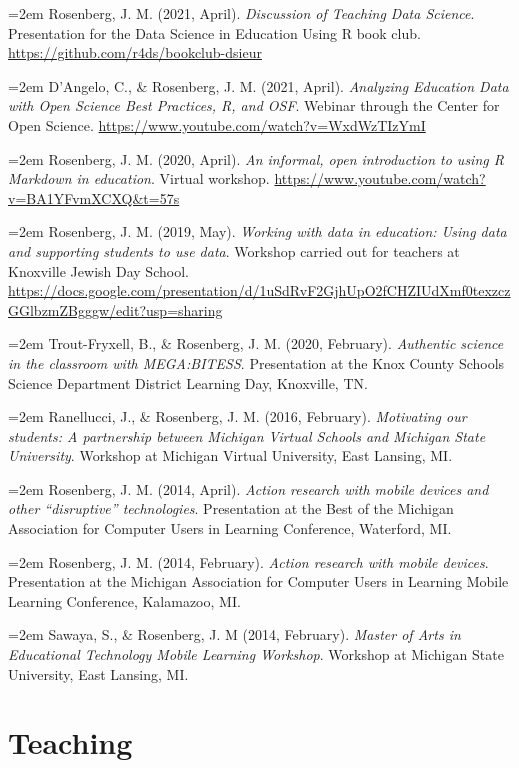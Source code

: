 \documentclass[
  14,
]{article}
\begin{document}
\hangindent=2em Rosenberg, J. M. (2021, April). \emph{Discussion of
Teaching Data Science}. Presentation for the Data Science in Education
Using R book club. \url{https://github.com/r4ds/bookclub-dsieur}

\hangindent=2em D'Angelo, C., \& Rosenberg, J. M. (2021, April).
\emph{Analyzing Education Data with Open Science Best Practices, R, and
OSF}. Webinar through the Center for Open Science.
\url{https://www.youtube.com/watch?v=WxdWzTIzYmI}

\hangindent=2em Rosenberg, J. M. (2020, April). \emph{An informal, open
introduction to using R Markdown in education}. Virtual workshop.
\url{https://www.youtube.com/watch?v=BA1YFvmXCXQ\&t=57s}

\hangindent=2em Rosenberg, J. M. (2019, May). \emph{Working with data in
education: Using data and supporting students to use data}. Workshop
carried out for teachers at Knoxville Jewish Day School.
\url{https://docs.google.com/presentation/d/1uSdRvF2GjhUpO2fCHZIUdXmf0texzczGGlbzmZBgggw/edit?usp=sharing}

\hangindent=2em Trout-Fryxell, B., \& Rosenberg, J. M. (2020, February).
\emph{Authentic science in the classroom with MEGA:BITESS}. Presentation
at the Knox County Schools Science Department District Learning Day,
Knoxville, TN.

\hangindent=2em Ranellucci, J., \& Rosenberg, J. M. (2016, February).
\emph{Motivating our students: A partnership between Michigan Virtual
Schools and Michigan State University}. Workshop at Michigan Virtual
University, East Lansing, MI.

\hangindent=2em Rosenberg, J. M. (2014, April). \emph{Action research
with mobile devices and other ``disruptive'' technologies}. Presentation
at the Best of the Michigan Association for Computer Users in Learning
Conference, Waterford, MI.

\hangindent=2em Rosenberg, J. M. (2014, February). \emph{Action research
with mobile devices}. Presentation at the Michigan Association for
Computer Users in Learning Mobile Learning Conference, Kalamazoo, MI.

\hangindent=2em Sawaya, S., \& Rosenberg, J. M (2014, February).
\emph{Master of Arts in Educational Technology Mobile Learning
Workshop}. Workshop at Michigan State University, East Lansing, MI.

\hypertarget{teaching}{%
\section{Teaching}\label{teaching}}
\end{document}

